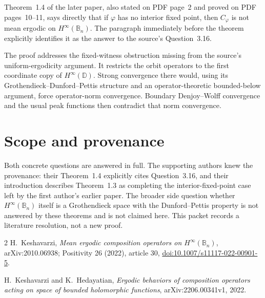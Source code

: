 \documentclass[11pt]{article}
\newcommand{\B}{\mathbb B}
\begin{document}
Theorem~1.4 of the later paper, also stated on PDF page~2 and proved on PDF
pages~10--11, says directly that if $\varphi$ has no interior fixed point,
then $C_\varphi$ is not mean ergodic on $H^\infty(\B_n)$.  The paragraph
immediately before the theorem explicitly identifies it as the answer to
the source's Question~3.16.

The proof addresses the fixed-witness obstruction missing from the source's
uniform-ergodicity argument.  It restricts the orbit operators to the first
coordinate copy of $H^\infty(\mathbb D)$.  Strong convergence there would,
using its Grothendieck--Dunford--Pettis structure and an operator-theoretic
bounded-below argument, force operator-norm convergence.  Boundary
Denjoy--Wolff convergence and the usual peak functions then contradict that
norm convergence.

\section{Scope and provenance}

Both concrete questions are answered in full.  The supporting authors knew
the provenance: their Theorem~1.4 explicitly cites Question~3.16, and their
introduction describes Theorem~1.3 as completing the interior-fixed-point
case left by the first author's earlier paper.  The broader side question
whether $H^\infty(\B_n)$ itself is a Grothendieck space with the
Dunford--Pettis property is not answered by these theorems and is not claimed
here.  This packet records a literature resolution, not a new proof.

\begin{thebibliography}{2}
H.~Keshavarzi,
\emph{Mean ergodic composition operators on $H^\infty(\mathbb B_n)$},
arXiv:2010.06938; Positivity 26 (2022), article 30,
\href{https://doi.org/10.1007/s11117-022-00901-5}{doi:10.1007/s11117-022-00901-5}.

H.~Keshavarzi and K.~Hedayatian,
\emph{Ergodic behaviors of composition operators acting on space of bounded
holomorphic functions}, arXiv:2206.00341v1, 2022.
\end{thebibliography}
\end{document}
